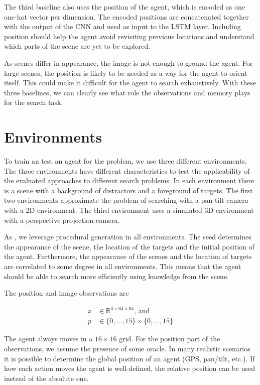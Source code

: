 The third baseline also uses the position of the agent, which is encoded as one one-hot vector per dimension. 
The encoded positions are concatenated together with the output of the CNN and used as input to the LSTM layer.
Including position should help the agent avoid revisiting previous locations and understand which parts of the scene are yet to be explored. 

As scenes differ in appearance, the image is not enough to ground the agent.
For large scenes, the position is likely to be needed as a way for the agent to orient itself.
This could make it difficult for the agent to search exhaustively.
With these three baselines, we can clearly see what role the observations and memory plays for the search task.

\section{Environments}
\label{sec:environments}

To train an test an agent for the problem, we use three different environments.
The three environments have different characteristics to test the applicability of the evaluated approaches to different search problems.
In each environment there is a scene with a background of distractors and a foreground of targets.
The first two environments approximate the problem of searching with a pan-tilt camera with a 2D environment.
The third environment uses a simulated 3D environment with a perspective projection camera. 

As \cite{cobbe_procgen_2020,mnih_asynchronous_2016}, we leverage procedural generation in all environments.
The seed determines the appearance of the scene, the location of the targets and the initial position of the agent.
Furthermore, the appearance of the scenes and the location of targets are correlated to some degree in all environments.
This means that the agent should be able to search more efficiently using knowledge from the scene.

The position and image observations are

\begin{align*}
    x & \in \mathbb{R}^{3 \times 64 \times 64} \text{, and} \\
    p & \in \{0, \dots, 15\} \times \{0, \dots, 15\}
\end{align*}

The agent always moves in a \(16 \times 16\) grid.
For the position part of the observations, we assume the presence of some oracle.
In many realistic scenarios it is possible to determine the global position of an agent (GPS, pan/tilt, etc.).
If how each action moves the agent is well-defined, the relative position can be used instead of the absolute one.

